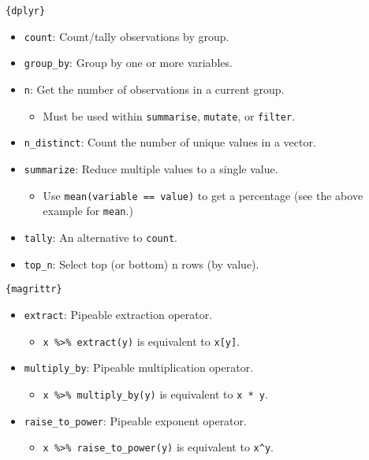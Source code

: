 \documentclass[
]{book}
\providecommand{\tightlist}{%
  \setlength{\itemsep}{0pt}\setlength{\parskip}{0pt}}
\begin{document}
\texttt{\{dplyr\}}

\begin{itemize}
\tightlist
\item
  \texttt{count}: Count/tally observations by group.
\item
  \texttt{group\_by}: Group by one or more variables.
\item
  \texttt{n}: Get the number of observations in a current group.

  \begin{itemize}
  \tightlist
  \item
    Must be used within \texttt{summarise}, \texttt{mutate}, or \texttt{filter}.
  \end{itemize}
\item
  \texttt{n\_distinct}: Count the number of unique values in a vector.
\item
  \texttt{summarize}: Reduce multiple values to a single value.

  \begin{itemize}
  \tightlist
  \item
    Use \texttt{mean(variable\ ==\ value)} to get a percentage (see the above example for \texttt{mean}.)
  \end{itemize}
\item
  \texttt{tally}: An alternative to \texttt{count}.
\item
  \texttt{top\_n}: Select top (or bottom) n rows (by value).
\end{itemize}

\texttt{\{magrittr\}}

\begin{itemize}
\tightlist
\item
  \texttt{extract}: Pipeable extraction operator.

  \begin{itemize}
  \tightlist
  \item
    \texttt{x\ \%\textgreater{}\%\ extract(y)} is equivalent to \texttt{x{[}y{]}}.
  \end{itemize}
\item
  \texttt{multiply\_by}: Pipeable multiplication operator.

  \begin{itemize}
  \tightlist
  \item
    \texttt{x\ \%\textgreater{}\%\ multiply\_by(y)} is equivalent to \texttt{x\ *\ y}.
  \end{itemize}
\item
  \texttt{raise\_to\_power}: Pipeable exponent operator.

  \begin{itemize}
  \tightlist
  \item
    \texttt{x\ \%\textgreater{}\%\ raise\_to\_power(y)} is equivalent to \texttt{x\^{}y}.
  \end{itemize}
\end{itemize}
\end{document}
